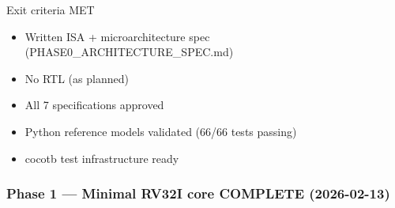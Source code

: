 \begin{record}
\ok{} Exit criteria MET

\begin{itemize}
\tightlist
\item
  \ok{} Written ISA + microarchitecture spec
  (PHASE0\_\allowbreak{}ARCHITECTURE\_\allowbreak{}SPEC.md)
\item
  \ok{} No RTL (as planned)
\item
  \ok{} All 7 specifications approved
\item
  \ok{} Python reference models validated (66/66 tests passing)
\item
  \ok{} cocotb test infrastructure ready
\end{itemize}

\end{record}

\subsubsection{\texorpdfstring{Phase 1 --- Minimal RV32I core \ok{}
COMPLETE
(2026-02-13)}{Phase 1 --- Minimal RV32I core  COMPLETE (2026-02-13)}}\label{cr:status:roadmap:phase-1-minimal-rv32i-core-white-check-mark-complete-2026-02-13}

